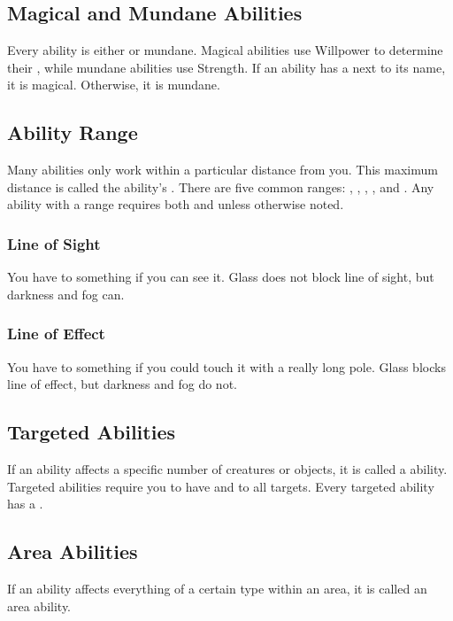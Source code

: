   \subsection{Magical and Mundane Abilities}\label{Magical and Mundane Abilities}
    Every ability is either \magical or mundane.
    Magical abilities use Willpower to determine their , while mundane abilities use Strength.
    If an ability has a \sparkle{} next to its name, it is magical.
    Otherwise, it is mundane.

  \subsection{Ability Range}\label{Ability Range}
    Many abilities only work within a particular distance from you.
    This maximum distance is called the ability's .
    There are five common ranges: \shortrange, \medrange, \longrange, \distrange, and \extrange.
    Any ability with a range requires both  and  unless otherwise noted.

  \subsubsection{Line of Sight}
    You have  to something if you can see it.
    Glass does not block line of sight, but darkness and fog can.

  \subsubsection{Line of Effect}
    You have  to something if you could touch it with a really long pole.
    Glass blocks line of effect, but darkness and fog do not.

  \subsection{Targeted Abilities}\label{Targeted Abilities}
    If an ability affects a specific number of creatures or objects, it is called a  ability.
    Targeted abilities require you to have  and  to all targets.
    Every targeted ability has a .

  \subsection{Area Abilities}\label{Area Abilities}
    If an ability affects everything of a certain type within an area, it is called an area ability.

